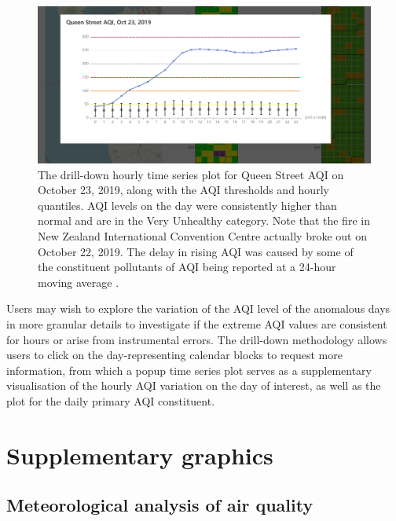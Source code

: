 \documentclass{aucklandthesis}
\begin{document}
\begin{figure}
\includegraphics[width=1\linewidth]{figures/cal-drill-down} \caption{The drill-down hourly time series plot for Queen Street AQI on October 23, 2019, along with the AQI thresholds and hourly quantiles. AQI levels on the day were consistently higher than normal and are in the Very Unhealthy category. Note that the fire in New Zealand International Convention Centre actually broke out on October 22, 2019. The delay in rising AQI was caused by some of the constituent pollutants of AQI being reported at a 24-hour moving average \autocite{aqitarget}.}\label{fig:unnamed-chunk-2}
\end{figure}



Users may wish to explore the variation of the AQI level of the anomalous days in more granular details to investigate if the extreme AQI values are consistent for hours or arise from instrumental errors. The drill-down methodology allows users to click on the day-representing calendar blocks to request more information, from which a popup time series plot serves as a supplementary visualisation of the hourly AQI variation on the day of interest, as well as the plot for the daily primary AQI constituent.

\hypertarget{supplementary-graphics}{%
\section{Supplementary graphics}\label{supplementary-graphics}}

\hypertarget{sec:met-table}{%
\subsection{Meteorological analysis of air quality}\label{sec:met-table}}
\end{document}
